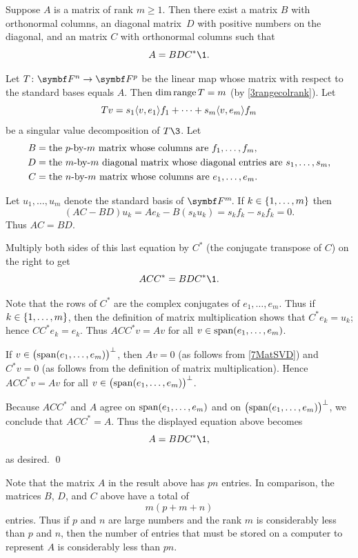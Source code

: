 {Suppose $A$ is a  matrix of rank $m\ge1$. Then there exist a  matrix $B$ with orthonormal columns, an  diagonal matrix~$D$ with positive numbers on the diagonal, and an  matrix $C$ with orthonormal columns such that
\[
A = B D C^*\1.
\]}

\proof
Let $\fun T {\F{n}} {\F{p}}$ be the linear map whose matrix with respect to the standard bases equals $A$. Then $\dim \ran T = m$ (by \ref{3rangecolrank}). Let
\begin{equation} \label{7MatSVD}
Tv = s_1 \ip{v, e_1}f_1 + \cdots + s_m \ip{v, e_m} f_m
\end{equation}%
be a singular value decomposition of $T\3$. Let
\begin{align*}
B &= \text{the \by{p}{m} matrix whose columns are } f_1, \ldots, f_m, \\
D &= \text{the \by{m}{m} diagonal matrix whose diagonal entries are } s_1, \ldots, s_m, \\
C &= \text{the \by{n}{m} matrix whose columns are } e_1, \ldots, e_m.
\end{align*}

Let $u_1, \ldots, u_m$ denote the standard basis of $\FF{m}$. If $k \in \br{1, \ldots, m}$ then
\[
(AC - BD)u_k = Ae_k - B(s_k u_k) = s_k f_k - s_k f_k = 0.
\]
Thus $AC = B D$.

Multiply both sides of this last equation by $C^*$ (the conjugate transpose of $C$) on the right to get
\[
ACC^* = B D C^*\1.
\]

Note that the rows of $C^*$ are the complex conjugates of $e_1, \ldots, e_m$. Thus if $k \in \br{1, \ldots, m}$, then the definition of matrix multiplication shows that $C^*e_k = u_k$; hence $CC^* e_k = e_k$. Thus $ACC^*v = Av$ for all
$v \in \Span(e_1, \dots, e_m)$.

If $v \in \paren[\big]{\Span(e_1, \ldots, e_m)}^\perp$, then $Av = 0$ (as follows from \ref{7MatSVD}) and $C^*v = 0$ (as follows from the definition of matrix multiplication). Hence $ACC^*v = Av$ for all $v \in \paren[\big]{\Span(e_1, \dots, e_m)}^\perp$.

Because $ACC^*$ and $A$ agree on $\Span(e_1, \dots, e_m)$ and on $\paren[\big]{\Span(e_1, \dots, e_m)}^\perp$, we conclude that $ACC^* = A$. Thus the displayed equation above becomes
\[
A = B D C^*\1,
\]
as desired.
\qed

Note that the matrix $A$ in the result above has $pn$ entries. In comparison, the matrices $B$, $D$, and $C$ above have a total of
\[
m(p + m + n)
\]
entries. Thus if $p$ and $n$ are large numbers and the rank $m$ is considerably less than $p$ and $n$, then the number of entries that must be stored on a computer to represent $A$ is considerably less than $pn$.


